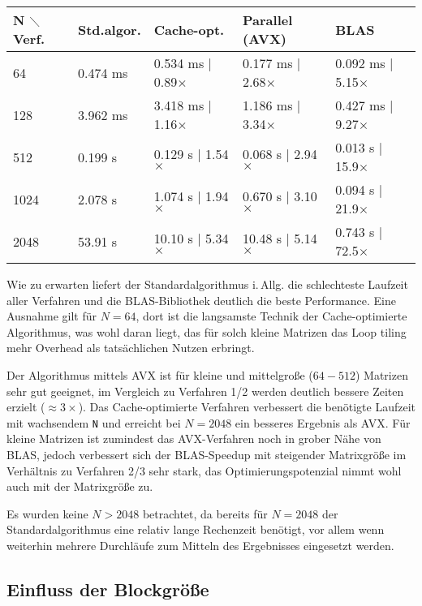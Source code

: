 \documentclass[a4paper,11pt]{scrartcl}
\newcommand{\iAllg}{\mbox{i.\,Allg.}\xspace}
\begin{document}
\begin{tabular}{| l | l || l || l || l |}
\hline
N $\diagdown$ Verf. & Std.algor. & Cache-opt. & Parallel (AVX) & BLAS  \\ \hline

64 & 0.474 ms & 0.534 ms | 0.89$\times$ & 0.177 ms | 2.68$\times$ & 0.092 ms | 5.15$\times$  \\ \hline
128 & 3.962 ms & 3.418 ms | 1.16$\times$ & 1.186 ms | 3.34$\times$ & 0.427 ms | 9.27$\times$  \\ \hline 
\hline
512 & 0.199 s & 0.129 s | 1.54$\times$ & 0.068 s | 2.94$\times$ & 0.013 s | 15.9$\times$  \\ \hline
1024 & 2.078 s &  1.074 s | 1.94$\times$ & 0.670 s | 3.10$\times$ & 0.094 s | 21.9$\times$ \\ \hline
2048 & 53.91 s & 10.10 s | 5.34$\times$ & 10.48 s | 5.14$\times$ & 0.743 s | 72.5$\times$ \\ \hline
 
\end{tabular}\newline

Wie zu erwarten liefert der Standardalgorithmus \iAllg die schlechteste Laufzeit aller 
Verfahren und die BLAS-Bibliothek deutlich die beste Performance.
Eine Ausnahme gilt für $N=64$, dort ist die langsamste Technik der Cache-optimierte
Algorithmus, was wohl daran liegt, das für solch kleine Matrizen das Loop tiling mehr
Overhead als tatsächlichen Nutzen erbringt.\newline

Der Algorithmus mittels AVX ist für kleine und mittelgroße ($64-512$) Matrizen sehr gut
geeignet, im Vergleich zu Verfahren 1/2 werden deutlich bessere Zeiten erzielt
($\approx 3\times$).
Das Cache-optimierte Verfahren verbessert die benötigte Laufzeit mit wachsendem \texttt{N}
und erreicht bei $N=2048$ ein besseres Ergebnis als AVX.
Für kleine Matrizen ist zumindest das AVX-Verfahren noch in grober Nähe von BLAS,
jedoch verbessert sich der BLAS-Speedup mit steigender Matrixgröße im Verhältnis
zu Verfahren 2/3 sehr stark, das Optimierungspotenzial nimmt wohl auch mit der Matrixgröße zu.
\newline

Es wurden keine $N>2048$ betrachtet, da bereits für $N=2048$
der Standardalgorithmus eine relativ lange Rechenzeit benötigt, vor allem wenn weiterhin mehrere
Durchläufe zum Mitteln des Ergebnisses eingesetzt werden.


\subsection{Einfluss der Blockgröße}\label{chp:BS}
\end{document}
